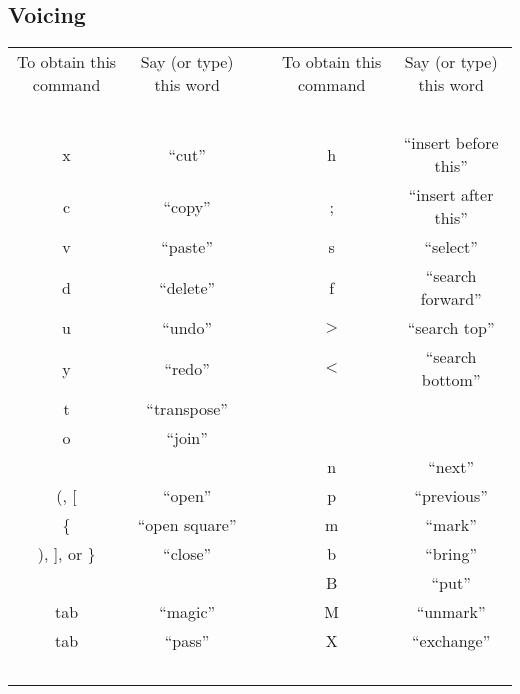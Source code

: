 \documentclass[landscape,letterpaper]{article}
\begin{document}
\subsection*{Voicing}
\begin{tabular}{|c|c|c|c|c|} 
 To obtain this command  & Say (or type) this word  & ~ &  To obtain this command  & Say (or type) this word \\
 ~ & ~  & ~ & ~ & ~  \\
       x    &        ``cut''    & \hspace{1in}  &       h    &       ``insert before this''  \\
       c    &        ``copy''              & ~  &       ;&           ``insert after this''    \\
       v     &       ``paste''             & ~  &       s         &  ``select''              \\
       d    &        ``delete''            & ~  &       f        &   ``search forward''      \\
       u    &        ``undo''              & ~  &       $>$       &    ``search top''          \\
       y    &        ``redo''              & ~  &       $<$       &    ``search bottom''       \\
       t    &        ``transpose''         & ~  &    ~ & ~                           \\    
       o          &  ``join''              & ~  &    ~ & ~                           \\
 ~ & ~                                 & ~  &           n       &    ``next''                \\
    (, [          &  ``open''              & ~  &       p       &    ``previous''            \\
       \{       &    ``open square''       & ~  &       m   &        ``mark''                 \\
    ), ], or \}  &   ``close''             & ~  &       b       &    ``bring''               \\
 ~ & ~                                 & ~  &           B   &        ``put''                 \\
     tab        &    ``magic''             & ~  &       M       &    ``unmark''              \\
     tab   &       ``pass''              & ~  &         X       &    ``exchange''            \\
 ~ & ~                                 & ~  &   ~ & ~                             \\

\end{tabular}
\end{document}
